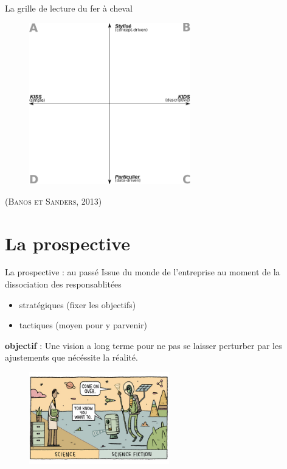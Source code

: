 \documentclass[newPxFont]{beamer}
\begin{document}
\begin{frame}[c]{La grille de lecture du fer à cheval}
  \vspace{-2em}
  \begin{figure}
   \includegraphics[height=7cm]{img/a_banos_sanders.png}
  \end{figure}
  \hspace*{\fill}\textsc{(Banos et Sanders, 2013)}
\end{frame}



%
%
\section{La prospective}

\begin{frame}[c]{La prospective : au passé}
  \vspace{-2em}
  Issue du monde de l'entreprise au moment de la dissociation des responsablitées
  \begin{itemize}
    \item stratégiques (fixer les objectifs)
    \item tactiques (moyen pour y parvenir)
  \end{itemize}
  \textbf{objectif} : Une vision a long terme pour ne pas se laisser perturber par les ajustements que nécéssite la réalité.
  \begin{figure}
   \includegraphics[height=4cm]{img/a_gauld_tom_new_scientist.jpg}
  \end{figure}
\end{frame}
\end{document}
